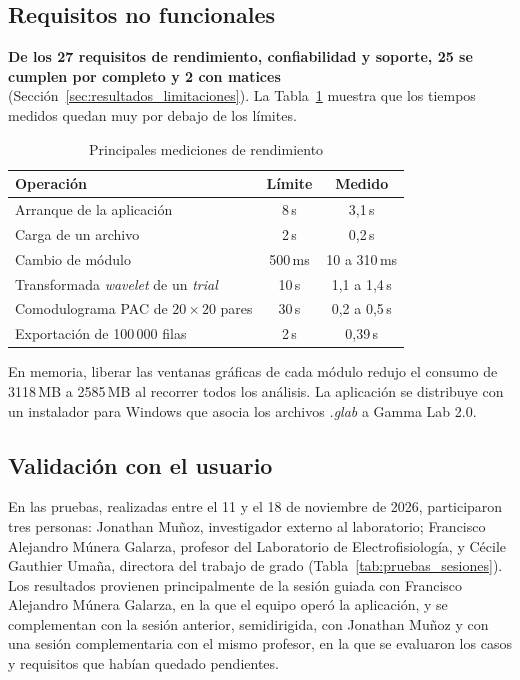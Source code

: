 \documentclass[12pt,letterpaper,oneside]{article}
\begin{document}
\subsection{Requisitos no funcionales}

\textbf{De los 27 requisitos de rendimiento, confiabilidad y soporte, 25 se cumplen por completo y 2 con matices} (Sección~\ref{sec:resultados_limitaciones}). La Tabla~\ref{tab:resultados_rendimiento} muestra que los tiempos medidos quedan muy por debajo de los límites.

\begin{table}[H]
\centering
\scriptsize
\renewcommand{\arraystretch}{1.3}
\begin{tabularx}{\textwidth}{|>{\raggedright\arraybackslash}X|c|c|}
\hline
\textbf{Operación} & \textbf{Límite} & \textbf{Medido} \\
\hline
Arranque de la aplicación & 8\,s & 3,1\,s \\
\hline
Carga de un archivo & 2\,s & 0,2\,s \\
\hline
Cambio de módulo & 500\,ms & 10 a 310\,ms \\
\hline
Transformada \textit{wavelet} de un \textit{trial} & 10\,s & 1,1 a 1,4\,s \\
\hline
Comodulograma PAC de $20\times20$ pares & 30\,s & 0,2 a 0,5\,s \\
\hline
Exportación de 100\,000 filas & 2\,s & 0,39\,s \\
\hline
\end{tabularx}
\caption{Principales mediciones de rendimiento}
\label{tab:resultados_rendimiento}
\end{table}

En memoria, liberar las ventanas gráficas de cada módulo redujo el consumo de 3118\,MB a 2585\,MB al recorrer todos los análisis. La aplicación se distribuye con un instalador para Windows que asocia los archivos \textit{.glab} a Gamma Lab 2.0.

\subsection{Validación con el usuario}

En las pruebas, realizadas entre el 11 y el 18 de noviembre de 2026, participaron tres personas: Jonathan Muñoz, investigador externo al laboratorio; Francisco Alejandro Múnera Galarza, profesor del Laboratorio de Electrofisiología, y Cécile Gauthier Umaña, directora del trabajo de grado (Tabla~\ref{tab:pruebas_sesiones}). Los resultados provienen principalmente de la sesión guiada con Francisco Alejandro Múnera Galarza, en la que el equipo operó la aplicación, y se complementan con la sesión anterior, semidirigida, con Jonathan Muñoz y con una sesión complementaria con el mismo profesor, en la que se evaluaron los casos y requisitos que habían quedado pendientes.
\end{document}
